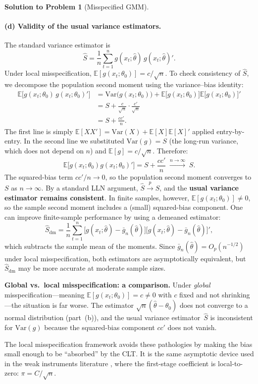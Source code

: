 \documentclass[12pt]{article}
\newcommand{\E}{\mathbb E}
\newcommand{\Var}{\mathrm{Var}}
\theoremstyle{definition}
\newtheorem{solution}{Solution to Problem}
\begin{document}
\begin{solution}[Misspecified GMM]
\paragraph{(d) Validity of the usual variance estimators.} The standard variance estimator is
\[
\hat{S} = \frac{1}{n}\sum_{t=1}^n g(x_t;\hat\theta)\,g(x_t;\hat\theta)'.
\]
Under local misspecification, $\E[g(x_t;\theta_0)]=c/\sqrt{n}$. To check consistency of $\hat S$, we decompose the population second moment using the variance--bias identity:
\begin{align*}
\E\!\bigl[g(x_t;\theta_0)\,g(x_t;\theta_0)'\bigr]
&= \Var\!\bigl(g(x_t;\theta_0)\bigr) + \E\!\bigl[g(x_t;\theta_0)\bigr]\E\!\bigl[g(x_t;\theta_0)\bigr]' \\[4pt]
&= S + \frac{c}{\sqrt{n}}\cdot\frac{c'}{\sqrt{n}} \\[4pt]
&= S + \frac{cc'}{n}.
\end{align*}
The first line is simply $\E[XX'] = \Var(X)+\E[X]\E[X]'$ applied entry-by-entry. In the second line we substituted $\Var(g)=S$ (the long-run variance, which does not depend on $n$) and $\E[g]=c/\sqrt{n}$. Therefore:
\[
\E\bigl[g(x_t;\theta_0)g(x_t;\theta_0)'\bigr] = S + \frac{cc'}{n} \;\xrightarrow{n\to\infty}\; S.
\]
The squared-bias term $cc'/n\to 0$, so the population second moment converges to $S$ as $n\to\infty$. By a standard LLN argument, $\hat{S}\xrightarrow{p}S$, and the \textbf{usual variance estimator remains consistent}. In finite samples, however, $\E[g(x_t;\theta_0)]\neq 0$, so the sample second moment includes a (small) squared-bias component. One can improve finite-sample performance by using a demeaned estimator:
\[
\hat{S}_{\text{dm}} = \frac{1}{n}\sum_{t=1}^n \bigl[g(x_t;\hat\theta)-\bar{g}_n(\hat\theta)\bigr]\bigl[g(x_t;\hat\theta)-\bar{g}_n(\hat\theta)\bigr]',
\]
which subtracts the sample mean of the moments. Since $\bar{g}_n(\hat\theta)=O_p(n^{-1/2})$ under local misspecification, both estimators are asymptotically equivalent, but $\hat{S}_{\text{dm}}$ may be more accurate at moderate sample sizes.

\medskip
\noindent\textbf{Global vs.\ local misspecification: a comparison.} Under \emph{global} misspecification---meaning $\E[g(x_t;\theta_0)]=c\neq 0$ with $c$ fixed and not shrinking---the situation is far worse. The estimator $\sqrt{n}(\hat\theta-\theta_0)$ does not converge to a normal distribution (part~(b)), and the usual variance estimator~$\hat{S}$ is inconsistent for $\Var(g)$ because the squared-bias component $cc'$ does not vanish.

The local misspecification framework avoids these pathologies by making the bias small enough to be ``absorbed'' by the CLT. It is the same asymptotic device used in the weak instruments literature \citep{StaigerStock1997}, where the first-stage coefficient is local-to-zero: $\pi=C/\sqrt{n}$.

\end{solution}
\end{document}
